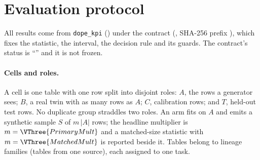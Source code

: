 \section{Evaluation protocol}\label{sec:protocol}

All results come from \texttt{dope\_kpi} () under the contract  (, SHA-256 prefix \texttt{}), which fixes the statistic, the interval, the decision rule and its guards.
The contract's status is ``'' and it is not frozen.

\paragraph{Cells and roles.}
A cell is one table with one row split into disjoint roles: $A$, the rows a generator sees; $B$, a real twin with as many rows as $A$; $C$, calibration rows; and $T$, held-out test rows.
No duplicate group straddles two roles.
An arm fits on $A$ and emits a synthetic sample $S$ of $m\,|A|$ rows; the headline multiplier is $m=\VThree{PrimaryMult}$ and a matched-size statistic with $m=\VThree{MatchedMult}$ is reported beside it.
Tables belong to lineage families (tables from one source), each assigned to one task.

